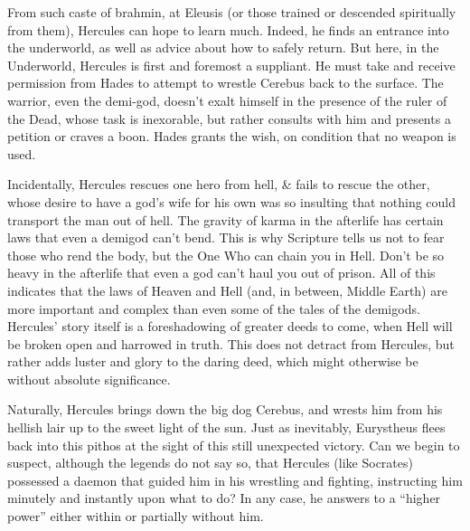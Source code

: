 From such caste of brahmin, at Eleusis (or those trained or descended spiritually from them), Hercules can hope to learn much. Indeed, he finds an entrance into the underworld, as well as advice about how to safely return. But here, in the Underworld, Hercules is first and foremost a suppliant. He must take and receive permission from Hades to attempt to wrestle Cerebus back to the surface. The warrior, even the demi-god, doesn't exalt himself in the presence of the ruler of the Dead, whose task is inexorable, but rather consults with him and presents a petition or craves a boon. Hades grants the wish, on condition that no weapon is used.

Incidentally, Hercules rescues one hero from hell, \& fails to rescue the other, whose desire to have a god's wife for his own was so insulting that nothing could transport the man out of hell. The gravity of karma in the afterlife has certain laws that even a demigod can't bend. This is why Scripture tells us not to fear those who rend the body, but the One Who can chain you in Hell. Don't be so heavy in the afterlife that even a god can't haul you out of prison. All of this indicates that the laws of Heaven and Hell (and, in between, Middle Earth) are more important and complex than even some of the tales of the demigods. Hercules' story itself is a foreshadowing of greater deeds to come, when Hell will be broken open and harrowed in truth. This does not detract from Hercules, but rather adds luster and glory to the daring deed, which might otherwise be without absolute significance.

Naturally, Hercules brings down the big dog Cerebus, and wrests him from his hellish lair up to the sweet light of the sun. Just as inevitably, Eurystheus flees back into this pithos at the sight of this still unexpected victory. Can we begin to suspect, although the legends do not say so, that Hercules (like Socrates) possessed a daemon that guided him in his wrestling and fighting, instructing him minutely and instantly upon what to do? In any case, he answers to a ``higher power'' either within or partially without him.

